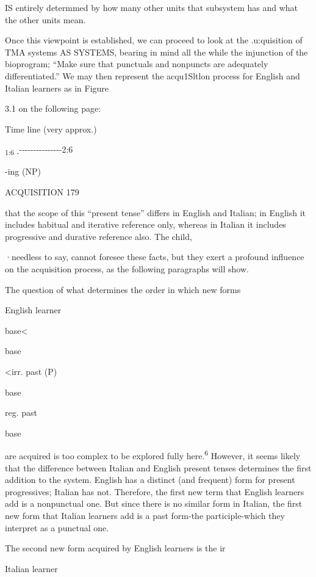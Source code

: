 IS entirely determmed by how many other units that subsystem has and what the other units mean.

Once this viewpoint is established, we can proceed to look at the .u:quisition of TMA systems AS SYSTEMS, bearing in mind all the while the injunction of the bioprogram; ``Make sure that punctuals and nonpuncts are adequately differentiated.'' We may then repre\-sent the acqu1Sltlon process for English and Italian learners as in Figure

3.1 on the following page:


Time line (very approx.)

\textsubscript{1}\textsubscript{:6 }\textsubscript{{}-}{}-{}-{}-{}-{}-{}-{}-{}-{}-{}-{}-{}-{}-{}-{}-2:6

{}-ing (NP)

ACQUISITION 179

that the scope of this ``present tense'' differs in English and Italian; in English it includes habitual and iterative reference only, whereas in Italian it includes progressive and durative reference also. The child,

·needless to say, cannot foresee these facts, but they exert a profound influence on the acquisition process, as the following paragraphs will show.

The question of what determines the order in which new forms

English learner

base{\textless}

base

{\textless}irr. past (P)

base

reg. past

base

are acquired is too complex to be explored fully here.\textsuperscript{6} However, it seems likely that the difference between Italian and English present tenses determines the first addition to the system. English has a dis\-tinct (and frequent) form for present progressives; Italian has not. Therefore, the first new term that English learners add is a nonpunctual one. But since there is no similar form in Italian, the first new form that Italian learners add is a past form-the participle-which they interpret as a punctual one.

The second new form acquired by English learners is the ir\-

Italian learner

